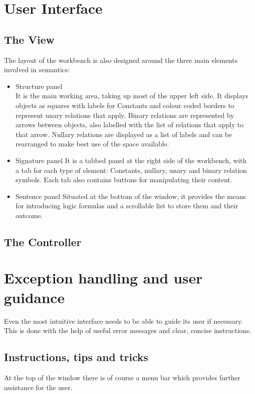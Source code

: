 \documentclass{report}
\begin{document}
\section{User Interface}
\subsection{The View}
The layout of the workbench is also designed around the three main elements involved in semantics:
\begin{itemize}
\item Structure panel \\
It is the main working area, taking up most of the upper left side. It displays objects as squares with labels for Constants and colour coded borders to represent unary relations that apply. Binary relations are represented by arrows between objects, also labelled with the list of relations that apply to that arrow. Nullary relations are displayed as a list of labels and can be rearranged to make best use of the space available.
\item Signature panel
It is a tabbed panel at the right side of the workbench, with a tab for each type of element: Constants, nullary, unary and binary relation symbols. Each tab also contains buttons for manipulating their content. 
\item Sentence panel
Situated at the bottom of the window, it provides the means for introducing logic formulas and a scrollable list to store them and their outcome.
\end{itemize}
  \subsection{The Controller}

\section{Exception handling and user guidance}
Even the most intuitive interface needs to be able to guide its user if necessary. This is done with the help of useful error messages and clear, concise instructions.

\subsection{Instructions, tips and tricks}
At the top of the window there is of course a menu bar which provides further assistance for the user. \\ \\
\end{document}
